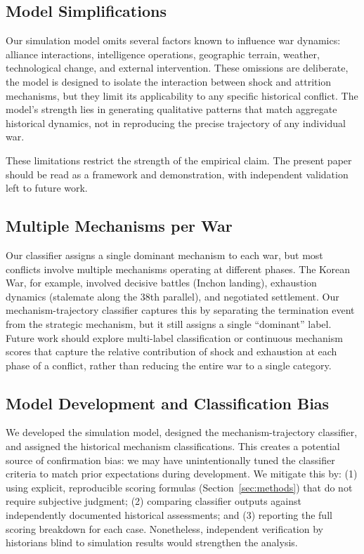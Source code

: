 \subsection{Model Simplifications}

Our simulation model omits several factors known to influence war dynamics: alliance interactions, intelligence operations, geographic terrain, weather, technological change, and external intervention. These omissions are deliberate, the model is designed to isolate the interaction between shock and attrition mechanisms, but they limit its applicability to any specific historical conflict. The model's strength lies in generating qualitative patterns that match aggregate historical dynamics, not in reproducing the precise trajectory of any individual war.

These limitations restrict the strength of the empirical claim. The present paper should be read as a framework and demonstration, with independent validation left to future work.

\subsection{Multiple Mechanisms per War}

Our classifier assigns a single dominant mechanism to each war, but most conflicts involve multiple mechanisms operating at different phases. The Korean War, for example, involved decisive battles (Inchon landing), exhaustion dynamics (stalemate along the 38th parallel), and negotiated settlement. Our mechanism-trajectory classifier captures this by separating the termination event from the strategic mechanism, but it still assigns a single ``dominant'' label. Future work should explore multi-label classification or continuous mechanism scores that capture the relative contribution of shock and exhaustion at each phase of a conflict, rather than reducing the entire war to a single category.

\subsection{Model Development and Classification Bias}

We developed the simulation model, designed the mechanism-trajectory classifier, and assigned the historical mechanism classifications. This creates a potential source of confirmation bias: we may have unintentionally tuned the classifier criteria to match prior expectations during development. We mitigate this by: (1) using explicit, reproducible scoring formulas (Section~\ref{sec:methods}) that do not require subjective judgment; (2) comparing classifier outputs against independently documented historical assessments; and (3) reporting the full scoring breakdown for each case. Nonetheless, independent verification by historians blind to simulation results would strengthen the analysis.
